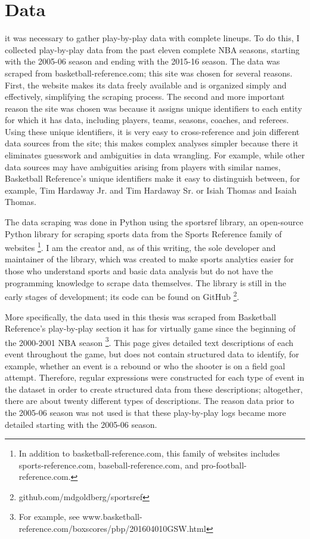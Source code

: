 
\chapter{Data} \label{ch:data}
\nocite{*}

 it was necessary to gather
play-by-play data with complete lineups. To do this, I collected play-by-play data
from the past eleven complete NBA seasons, starting with the 2005-06 season and
ending with the 2015-16 season. The data was scraped from basketball-reference.com;
this site was chosen for several reasons. First, the website makes its data freely
available and is organized simply and effectively, simplifying the scraping process.
The second and more important reason the site was chosen was because it assigns
unique identifiers to each entity for which it has data, including players, teams,
seasons, coaches, and referees.  Using these unique identifiers, it is very easy to
cross-reference and join different data sources from the site; this makes complex
analyses simpler because there it eliminates guesswork and ambiguities in data
wrangling. For example, while other data sources may have ambiguities arising from
players with similar names, Basketball Reference's unique identifiers make it easy
to distinguish between, for example, Tim Hardaway Jr.  and Tim Hardaway Sr. or Isiah
Thomas and Isaiah Thomas.

The data scraping was done in Python using the sportsref library, an open-source
Python library for scraping sports data from the Sports Reference family of websites
\footnote{In addition to basketball-reference.com, this family of websites
includes sports-reference.com, baseball-reference.com, and
pro-football-reference.com.}.
I am the creator and, as of this writing, the sole developer and maintainer of the
library, which was created to make sports analytics easier for those who understand
sports and basic data analysis but do not have the programming knowledge to scrape
data themselves. The library is still in the early stages of development; its
code can be found on GitHub
\footnote{github.com/mdgoldberg/sportsref}.

More specifically, the data used in this thesis was scraped from Basketball
Reference's play-by-play section it has for virtually game since the beginning of
the 2000-2001 NBA season \footnote{For example, see
www.basketball-reference.com/boxscores/pbp/201604010GSW.html}. This page gives
detailed text descriptions of each event throughout the game, but does not contain
structured data to identify, for example, whether an event is a rebound or who the
shooter is on a field goal attempt. Therefore, regular expressions were constructed
for each type of event in the dataset in order to create structured data from these
descriptions; altogether, there are about twenty different types of descriptions.
The reason data prior to the 2005-06 season was not used is that these play-by-play
logs became more detailed starting with the 2005-06 season.

